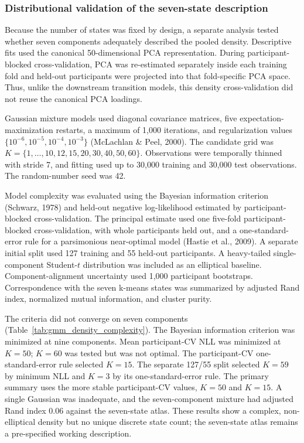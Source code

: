 \documentclass[12pt,a4paper]{report}
\begin{document}
\subsubsection{Distributional validation of the seven-state description}

Because the number of states was fixed by design, a separate analysis tested whether seven components adequately described the pooled density. Descriptive fits used the canonical 50-dimensional PCA representation. During participant-blocked cross-validation, PCA was re-estimated separately inside each training fold and held-out participants were projected into that fold-specific PCA space. Thus, unlike the downstream transition models, this density cross-validation did not reuse the canonical PCA loadings.

Gaussian mixture models used diagonal covariance matrices, five expectation-maximization restarts, a maximum of 1,000 iterations, and regularization values $\{10^{-6},10^{-5},10^{-4},10^{-3}\}$ (McLachlan \& Peel, 2000). The candidate grid was $K=\{1,\ldots,10,12,15,20,30,40,50,60\}$. Observations were temporally thinned with stride 7, and fitting used up to 30,000 training and 30,000 test observations. The random-number seed was 42.

Model complexity was evaluated using the Bayesian information criterion (Schwarz, 1978)
and held-out negative log-likelihood estimated by participant-blocked cross-validation. The principal estimate used one five-fold participant-blocked cross-validation, with whole participants held out, and a one-standard-error rule for a parsimonious near-optimal model (Hastie et al., 2009). A separate initial split used 127 training and 55 held-out participants. A heavy-tailed single-component Student-$t$ distribution was included as an elliptical baseline. Component-alignment uncertainty used 1,000 participant bootstraps. Correspondence with the seven k-means states was summarized by adjusted Rand index, normalized mutual information, and cluster purity.

The criteria did not converge on seven components (Table~\ref{tab:gmm_density_complexity}). The Bayesian information criterion was minimized at nine components. Mean participant-CV NLL was minimized at $K=50$; $K=60$ was tested but was not optimal. The participant-CV one-standard-error rule selected $K=15$. The separate 127/55 split selected $K=59$ by minimum NLL and $K=3$ by its one-standard-error rule. The primary summary uses the more stable participant-CV values, $K=50$ and $K=15$. A single Gaussian was inadequate, and the seven-component mixture had adjusted Rand index 0.06 against the seven-state atlas. These results show a complex, non-elliptical density but no unique discrete state count; the seven-state atlas remains a pre-specified working description.
\end{document}
